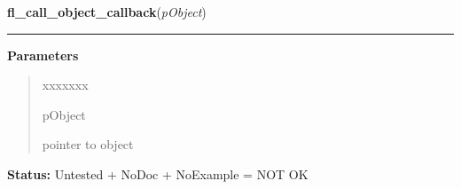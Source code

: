 \hspace{.8\funcindent}\begin{boxedminipage}{\funcwidth}

    \raggedright \textbf{fl\_call\_object\_callback}(\textit{pObject})

    \vspace{-1.5ex}

    \rule{\textwidth}{0.5\fboxrule}
\setlength{\parskip}{2ex}
\setlength{\parskip}{1ex}
      \textbf{Parameters}
      \vspace{-1ex}

      \begin{quote}
        \begin{Ventry}{xxxxxxx}

          \item[pObject]

          pointer to object

        \end{Ventry}

      \end{quote}

\textbf{Status:} Untested + NoDoc + NoExample = NOT OK



    \end{boxedminipage}

    \label{xformslib:library:fl_set_object_prehandler}

    \vspace{0.5ex}

